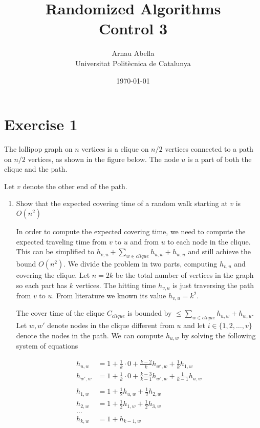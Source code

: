 \documentclass[12pt, a4paper]{article} %
\title{%
  Randomized Algorithms\\
  \large{Control 3}
}
\author{%
  Arnau Abella \\
  \large{Universitat Polit\`ecnica de Catalunya}
}
\date{\today}
\begin{document}
\maketitle


\section*{Exercise 1}%
\label{sec:exercise_1}

The lollipop graph on $n$ vertices is a clique on $n/2$ vertices connected to a path on $n/2$ vertices, as shown in the figure below. The node $u$ is a part of both the clique and the path.

Let $v$ denote the other end of the path.

\begin{enumerate}[label=(\alph*)]
  \item Show that the expected covering time of a random walk starting at $v$ is $O(n^{2})$

        In order to compute the expected covering time, we need to compute the expected traveling time from $v$ to $u$ and from $u$ to each node in the clique. This can be simplified to $h_{v,u} + \sum_{w \in clique}h_{u,w} + h_{w,u}$  and still achieve the bound $O(n^{2})$. We divide the problem in two parts, computing $h_{v,u}$ and covering the clique. Let $n = 2k$ be the total number of vertices in the graph so each part has $k$ vertices. The hitting time $h_{v,u}$ is just traversing the path from $v$ to $u$. From literature we known its  value $h_{v,u} = k^{2}$.

        The cover time of the clique $C_{clique}$ is bounded by $\leq \sum_{w \in clique} h_{u,w} + h_{w,u}$. Let $w, w'$ denote nodes in the clique different from $u$ and let $i \in \{1,2, \ldots, v\}$ denote the nodes in the path. We can compute $h_{u,w}$ by solving the following system of equations

        \begin{align*}
          h_{u,w} &= 1 + \frac{1}{k} \cdot 0 + \frac{k - 2}{k}h_{w',w} + \frac{1}{k}h_{1,w} \\
          h_{w',w} &= 1 + \frac{1}{k} \cdot 0 + \frac{k-3}{k-1}h_{w',w} + \frac{1}{k-1}h_{u,w} \\
          &\\
          h_{1,w} &= 1 + \frac{1}{2}h_{u,w} + \frac{1}{2}h_{2,w}\\
          h_{2,w} &= 1 + \frac{1}{2}h_{1,w} + \frac{1}{2}h_{3,w}\\
          \ldots & \\
          h_{k,w} &= 1 + h_{k-1,w}
        \end{align*}


\end{enumerate}
\end{document}
